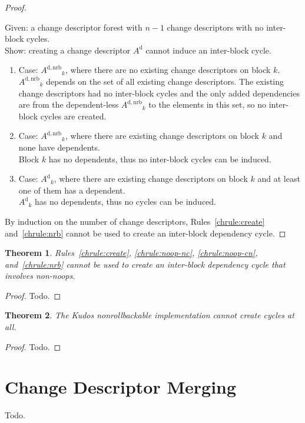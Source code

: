 \documentclass{article}
\newtheorem{thm}{Theorem}[section]
\theoremstyle{definition}
\newcommand{\cd}[1]{\ensuremath{#1}}
\newcommand{\cdb}[2]{\ensuremath{\cd{#1}_#2}}
\newcommand{\dcd}[1]{\ensuremath{\cd{#1}^\mathrm{d}}}
\newcommand{\dnrb}[1]{\ensuremath{\cd{#1}^\mathrm{d,nrb}}}
\begin{document}
\begin{proof}
\begin{itemize}
      Given: a change descriptor forest with $n-1$ change descriptors with no
      inter-block cycles.\\
      Show: creating a change descriptor \dcd{A} cannot induce an inter-block
      cycle.
      \begin{enumerate}
      \item Case: \cdb{\dnrb{A}}{k}, where there are no existing
        change descriptors on block $k$.\\
        \cdb{\dnrb{A}}{k} depends on the set of all existing change
        descriptors.  The existing change descriptors had no
        inter-block cycles and the only added dependencies are from
        the dependent-less \cdb{\dnrb{A}}{k} to the elements in this
        set, so no inter-block cycles are created.
      \item Case: \cdb{\dnrb{A}}{k}, where there are existing change
        descriptors on block $k$ and none have dependents.\\
        Block $k$ has no dependents, thus no inter-block cycles can be
        induced.
      \item Case: \cdb{\dcd{A}}{k}, where there are existing change
        descriptors on block $k$ and at least one of them has a dependent.\\
        \cdb{\dcd{A}}{k} has no dependents, thus no cycles can be induced.
      \end{enumerate}
  \end{itemize}
  By induction on the number of change descriptors, Rules~\ref{chrule:create}
  and~\ref{chrule:nrb} cannot be used to create an inter-block dependency
  cycle.
\end{proof}

\begin{thm}\label{thm::nrbnoopsafe}
  Rules~\ref{chrule:create}, \ref{chrule:noop-nc}, \ref{chrule:noop-cn},
  and~\ref{chrule:nrb} cannot be used to create an inter-block dependency
  cycle that involves non-noops.
\end{thm}
\begin{proof}
  Todo.
\end{proof}

\begin{thm}\label{thm::nrbimpsafe}
  The Kudos nonrollbackable implementation cannot create cycles at all.
\end{thm}
\begin{proof}
  Todo.
\end{proof}

\section{Change Descriptor Merging}
Todo.
\end{document}
